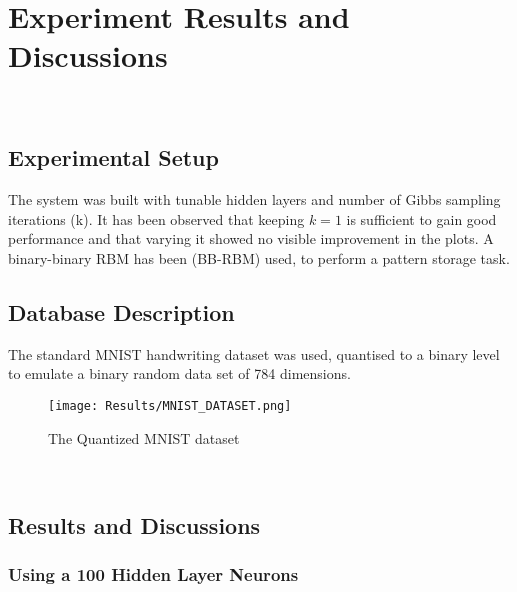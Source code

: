 
\chapter{Experiment Results and Discussions}
\HRule \\[-0.5cm] %

\begin{spacing}{0.5}
%
\section{Experimental Setup}
The system was built with tunable hidden layers and number of Gibbs sampling iterations (k). It has been observed that keeping $k=1$ is sufficient to gain good performance and that varying it showed no visible improvement in the plots. A binary-binary RBM has been (BB-RBM) used, to perform a pattern storage task.
\section{Database Description}
The standard MNIST handwriting dataset was used, quantised to a binary level to emulate a binary random data set of 784 dimensions.
\begin{figure}[h]
    \centering
    \texttt{[image: Results/MNIST\_DATASET.png]}
    \caption{The Quantized MNIST dataset}
    \label{fig:my_label}
\end{figure}\\
\newpage
\vspace{-10mm}
\section{Results and Discussions}

\subsection{Using a 100 Hidden Layer Neurons}

\begin{figure*}[htp]
  \hspace*{-15mm}
  \quad
  \hspace*{+10mm}


\end{figure*}
\end{spacing}
